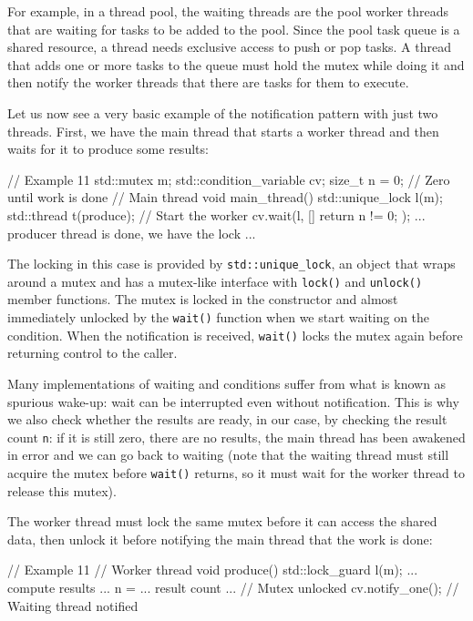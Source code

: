 For example, in a thread pool, the waiting threads are the pool worker threads that are waiting for tasks to be added to the pool. Since the pool task queue is a shared resource, a thread needs exclusive access to push or pop tasks. A thread that adds one or more tasks to the queue must hold the mutex while doing it and then notify the worker threads that there are tasks for them to execute.

Let us now see a very basic example of the notification pattern with just two threads. First, we have the main thread that starts a worker thread and then waits for it to produce some results:

\begin{code}
// Example 11
std::mutex m;
std::condition_variable cv;
size_t n = 0;               // Zero until work is done
// Main thread
void main_thread() {
  std::unique_lock l(m);
  std::thread t(produce);     // Start the worker
  cv.wait(l, []{ return n != 0; });
  ... producer thread is done, we have the lock ...
}
\end{code}

The locking in this case is provided by \texttt{std::unique\_lock}, an object that wraps around a mutex and has a mutex-like interface with \texttt{lock()} and \texttt{unlock()} member functions. The mutex is locked in the constructor and almost immediately unlocked by the \texttt{wait()} function when we start waiting on the condition. When the notification is received, \texttt{wait()} locks the mutex again before returning control to the caller.

Many implementations of waiting and conditions suffer from what is known as spurious wake-up: wait can be interrupted even without notification. This is why we also check whether the results are ready, in our case, by checking the result count \texttt{n}: if it is still zero, there are no results, the main thread has been awakened in error and we can go back to waiting (note that the waiting thread must still acquire the mutex before \texttt{wait()} returns, so it must wait for the worker thread to release this mutex).

The worker thread must lock the same mutex before it can access the shared data, then unlock it before notifying the main thread that the work is done:

\begin{code}
// Example 11
// Worker thread
void produce() {
  {
    std::lock_guard l(m);
    ... compute results ...
    n = ... result count ...
  } // Mutex unlocked
  cv.notify_one();          // Waiting thread notified
}
\end{code}

